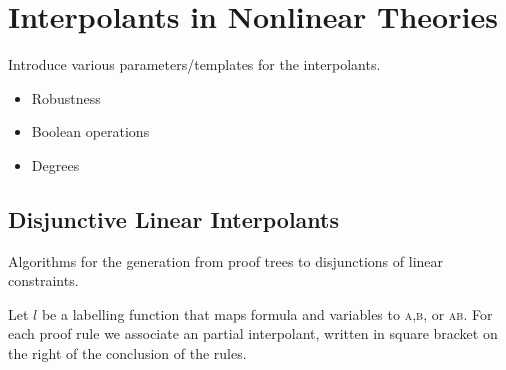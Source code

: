 \section{Interpolants in Nonlinear Theories}
\label{sec:itp}

Introduce various parameters/templates for the interpolants. 
\begin{itemize}
	\item Robustness
	\item Boolean operations
	\item Degrees 
\end{itemize}


\subsection{Disjunctive Linear Interpolants}

Algorithms for the generation from proof trees to disjunctions of linear constraints. 

Let $l$ be a labelling function that maps formula and variables to \textsc{a},\textsc{b}, or \textsc{ab}.
For each proof rule we associate an partial interpolant, written in square bracket on the right of the conclusion of the rules.


